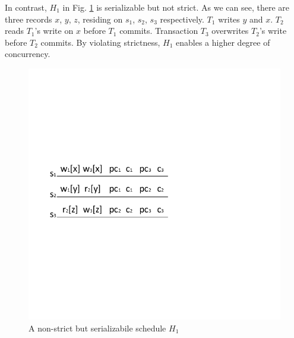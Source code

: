 \documentclass[conference]{IEEEtran}
\begin{document}
In contrast, ${H_1}$ in Fig. \ref{fig:non_strict_example} is serializable but not strict.
As we can see, there are three records ${x}$, ${y}$, ${z}$, residing on ${s_1}$, ${s_2}$, ${s_3}$ respectively.
${T_1}$ writes ${y}$ and ${x}$.
${T_2}$ reads ${T_1}$'s write on ${x}$ before ${T_1}$ commits.
Transaction ${T_3}$ overwrites ${T_2}$'s write before ${T_2}$ commits.
By violating strictness, ${H_1}$  enables a higher degree of concurrency.


\begin{figure}[tbp]
  \centerline{\includegraphics[scale=1]{figure/schedule_non_strict.pdf}}
  \caption{A non-strict but serializabile schedule ${H_1}$}
  \label{fig:non_strict_example}
\end{figure}
\end{document}
